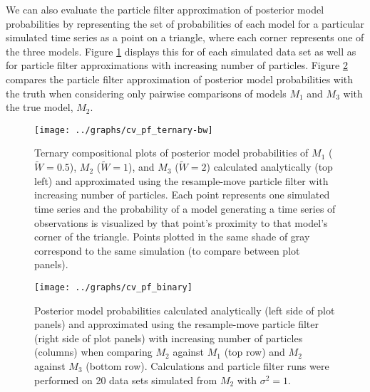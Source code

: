 \documentclass{article}
\begin{document}

We can also evaluate the particle filter approximation of posterior model probabilities by representing the set of probabilities of each model for a particular simulated time series as a point on a triangle, where each corner represents one of the three models. Figure \ref{fig:ternary} displays this for of each simulated data set as well as for particle filter approximations with increasing number of particles. Figure \ref{fig:binary} compares the particle filter approximation of posterior model probabilities with the truth when considering only pairwise comparisons of models $M_1$ and $M_3$ with the true model, $M_2$.

\begin{figure}
\texttt{[image: ../graphs/cv\_pf\_ternary-bw]}
\caption{Ternary compositional plots of posterior model probabilities of $M_1$ ($\tilde{W} = 0.5$), $M_2$ ($\tilde{W} = 1$), and $M_3$ ($\tilde{W} = 2$) calculated analytically (top left) and approximated using the resample-move particle filter with increasing number of particles. Each point represents one simulated time series and the probability of a model generating a time series of observations is visualized by that point's proximity to that model's corner of the triangle. Points plotted in the same shade of gray correspond to the same simulation (to compare between plot panels).} \label{fig:ternary}
\end{figure}

\begin{figure}
\texttt{[image: ../graphs/cv\_pf\_binary]}
\caption{Posterior model probabilities calculated analytically (left side of plot panels) and approximated using the resample-move particle filter (right side of plot panels) with increasing number of particles (columns) when comparing $M_2$ against $M_1$ (top row) and $M_2$ against $M_3$ (bottom row). Calculations and particle filter runs were performed on 20 data sets simulated from $M_2$ with $\sigma^2 = 1$.} \label{fig:binary}
\end{figure}

\clearpage



\end{document}
